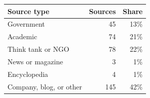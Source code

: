 \begin{tabular}{lrr}
\toprule
Source type & Sources & Share \\
\midrule
Government & 45 & 13\% \\
Academic & 74 & 21\% \\
Think tank or NGO & 78 & 22\% \\
News or magazine & 3 & 1\% \\
Encyclopedia & 4 & 1\% \\
Company, blog, or other & 145 & 42\% \\
\bottomrule
\end{tabular}
